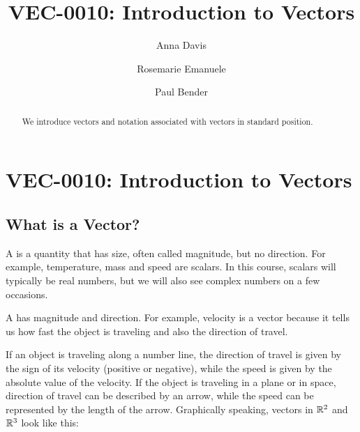 \documentclass{ximera}
\author{Anna Davis \and Rosemarie Emanuele \and Paul Bender} \title{VEC-0010: Introduction to Vectors} \license{CC-BY 4.0}
\begin{document}
\begin{abstract}
 We introduce vectors and notation associated with vectors in standard position.
\end{abstract}
\maketitle


\section*{VEC-0010: Introduction to Vectors}

\subsection*{What is a Vector?}

A  is a quantity that has size, often called  magnitude, but no direction.  For example, temperature, mass and speed are scalars.  In this course, scalars will typically be real numbers, but we will also see complex numbers on a few occasions.  

A  has magnitude and direction.  For example, velocity is a vector because it tells us how fast the object is traveling and also the direction of travel.  

If an object is traveling along a number line, the direction of travel is given by the sign of its velocity (positive or negative), while the speed is given by the absolute value of the velocity.  If the object is traveling in a plane or in space, direction of travel can be described by an arrow, while the speed can be represented by the length of the arrow.  Graphically speaking, vectors in $\mathbb{R}^2$ and $\mathbb{R}^3$ look like this: 

\begin{center}
\end{center}
\end{document}
